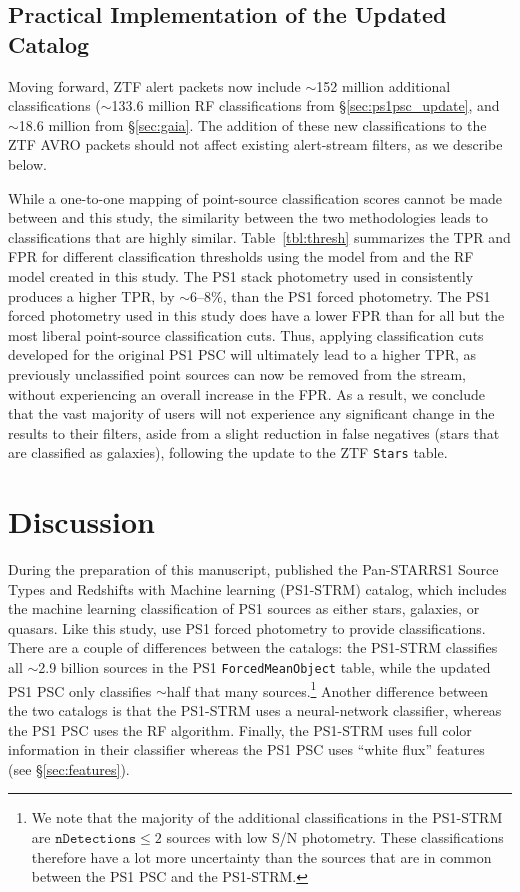 \documentclass[twocolumn]{aastex63}
\begin{document}
\subsection{Practical Implementation of the Updated Catalog}

Moving forward, ZTF alert packets now include $\sim$152 million additional
classifications ($\sim$133.6 million RF classifications from
\S\ref{sec:ps1psc_update}, and $\sim$18.6 million from
\S\ref{sec:gaia}. The addition of these new classifications to the ZTF AVRO
packets should not affect existing alert-stream filters, as we describe below.



While a one-to-one mapping of point-source classification scores cannot be
made between \citet{Tachibana18} and this study, the similarity between the
two methodologies leads to classifications that are highly similar.
Table~\ref{tbl:thresh} summarizes the TPR and FPR for different classification
thresholds using the model from \citet{Tachibana18} and the RF model created
in this study. The PS1 stack photometry used in \citet{Tachibana18}
consistently produces a higher TPR, by $\sim$6--8\%, than the PS1 forced
photometry. The PS1 forced photometry used in this study does have a lower FPR
than \citet{Tachibana18} for all but the most liberal point-source
classification cuts. Thus, applying classification cuts developed for the
original PS1 PSC will ultimately lead to a higher TPR, as previously
unclassified point sources can now be removed from the stream, without
experiencing an overall increase in the FPR. As a result, we conclude that the
vast majority of users will not experience any significant change in the
results to their filters, aside from a slight reduction in false negatives
(stars that are classified as galaxies), following the update to the ZTF
\texttt{Stars} table.

\section{Discussion}\label{sec:discussion}

During the preparation of this manuscript, \citet{Beck20} published the
Pan-STARRS1 Source Types and Redshifts with Machine learning (PS1-STRM)
catalog, which includes the machine learning classification of PS1 sources as
either stars, galaxies, or quasars. Like this study, \citet{Beck20} use PS1
forced photometry to provide classifications. There are a couple of
differences between the catalogs: the PS1-STRM classifies all $\sim$2.9
billion sources in the PS1 \texttt{ForcedMeanObject} table, while the updated
PS1 PSC only classifies $\sim$half that many sources.\footnote{We note that
the majority of the additional classifications in the PS1-STRM are
$\mathtt{nDetections} \le 2$ sources with low S/N photometry. These
classifications therefore have a lot more uncertainty than the sources that
are in common between the PS1 PSC and the PS1-STRM.} Another difference
between the two catalogs is that the PS1-STRM uses a neural-network
classifier, whereas the PS1 PSC uses the RF algorithm. Finally, the PS1-STRM
uses full color information in their classifier whereas the PS1 PSC uses
``white flux'' features (see \S\ref{sec:features}).
\end{document}

